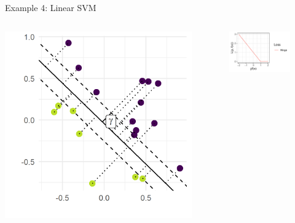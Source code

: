 \documentclass[11pt,compress,t,notes=noshow, xcolor=table]{beamer}
\begin{document}
\begin{vbframe}{Example 4: Linear SVM}
\begin{columns}[T] %
	\begin{column}{.3\textwidth}
		\begin{center}
			\includegraphics[width=1\textwidth]{figure_man/svm_geometry.png} 
		\end{center}
	\end{column} 
	\begin{column}{.3\textwidth}
	\begin{figure}
	\begin{center}
	\hspace*{-0.5cm}
		\includegraphics[width=1.3\textwidth]{figure_man/hinge.pdf}

\end{center}
\end{figure}
\end{column}
\end{columns}
\end{vbframe}
\end{document}
